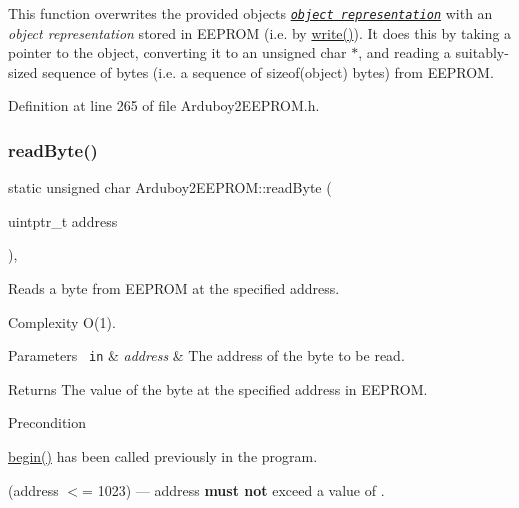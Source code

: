 This function overwrites the provided {\ttfamily object}\textquotesingle{}s \href{https://en.cppreference.com/w/cpp/language/object\#Object_representation_and_value_representation}{\texttt{ {\itshape object representation}}} with an {\itshape object representation} stored in E\+E\+P\+R\+OM (i.\+e. by {\ttfamily \mbox{\hyperlink{classArduboy2EEPROM_abf7be1f27f4815de59257210dac8c9eb}{write()}}}). It does this by taking a pointer to the {\ttfamily object}, converting it to an {\ttfamily unsigned char $\ast$}, and reading a suitably-\/sized sequence of bytes (i.\+e. a sequence of {\ttfamily sizeof(object)} bytes) from E\+E\+P\+R\+OM. 

Definition at line 265 of file Arduboy2\+E\+E\+P\+R\+O\+M.\+h.

\mbox{\label{classArduboy2EEPROM_aec3f9eea5f4adc592da921df2ae7ba2d}} 
\subsubsection{\texorpdfstring{readByte()}{readByte()}}
{\footnotesize\ttfamily static unsigned char Arduboy2\+E\+E\+P\+R\+O\+M\+::read\+Byte (\begin{DoxyParamCaption}\item[{uintptr\+\_\+t}]{address }\end{DoxyParamCaption})\hspace{0.3cm}{\ttfamily [inline]}, {\ttfamily [static]}}



Reads a byte from E\+E\+P\+R\+OM at the specified address. 

\begin{DoxyParagraph}{Complexity}
{\ttfamily O(1)}.
\end{DoxyParagraph}

\begin{DoxyParams}[1]{Parameters}
\mbox{\texttt{ in}}  & {\em address} & The address of the byte to be read.\\
\hline
\end{DoxyParams}
\begin{DoxyReturn}{Returns}
The value of the byte at the specified address in E\+E\+P\+R\+OM.
\end{DoxyReturn}
\begin{DoxyPrecond}{Precondition}
\begin{DoxyItemize}
\item {\ttfamily \mbox{\hyperlink{classArduboy2EEPROM_a4d482ef8e8204c56a0feba68791bc0c8}{begin()}}} has been called previously in the program. \item {\ttfamily (address $<$= 1023)} --- {\ttfamily address} {\bfseries{must not}} exceed a value of {}. \end{DoxyItemize}

\end{DoxyPrecond}


